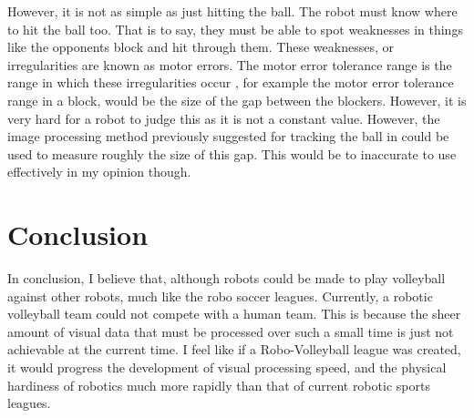 \documentclass{scrartcl}
\begin{document}
However, it is not as simple as just hitting the ball. The robot must know where to hit the ball too. That is to say, they must be able to spot weaknesses in things like the opponents block and hit through them. These weaknesses, or irregularities are known as motor errors. The motor error tolerance range is the range in which these irregularities occur \cite{ishimura1993information}, for example the motor error tolerance range in a block, would be the size of the gap between the blockers. However, it is very hard for a robot to judge this as it is not a constant value. However, the image processing method previously suggested for tracking the ball in \cite{wong2008developing} could be used to measure roughly the size of this gap. This would be to inaccurate to use effectively in my opinion though. 

\section{Conclusion}
In conclusion, I believe that, although robots could be made to play volleyball against other robots, much like the robo soccer leagues. Currently, a robotic volleyball team could not compete with a human team. This is because the sheer amount of visual data that must be processed over such a small time is just not achievable at the current time. I feel like if a Robo-Volleyball league was created, it would progress the development of visual processing speed, and the physical hardiness of robotics much more rapidly than that of current robotic sports leagues. 




\end{document}
